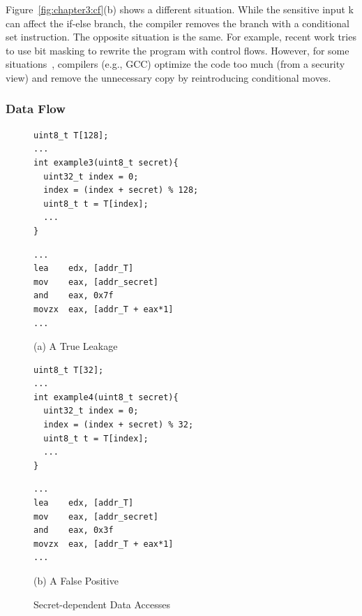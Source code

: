 Figure~\ref{fig:chapter3:cf}(b) shows a different situation. While the sensitive input \textsf{k} can affect the if-else branch, the compiler removes the branch with a conditional set instruction.  The opposite situation is the same. For example, recent work tries to use bit masking to rewrite the program with control flows. However, for some situations~\cite{Coppens:2009:PMT:1607723.1608124}, compilers (e.g., GCC) optimize the code too much (from a security view) and remove the unnecessary copy by reintroducing conditional moves.
\subsubsection{Data Flow}
\begin{figure}[h]
\begin{minipage}{0.4\linewidth}
\begin{lstlisting}[xleftmargin=.0\textwidth, xrightmargin=.0\textwidth, frame=none]
uint8_t T[128];
...
int example3(uint8_t secret){
  uint32_t index = 0;
  index = (index + secret) % 128;
  uint8_t t = T[index];
  ...
}
\end{lstlisting}
\end{minipage}
\hfill
\begin{minipage}{0.4\linewidth}
\begin{lstlisting}[xleftmargin=.0\textwidth, xrightmargin=.00\textwidth, frame=none, numbers=none, mathescape=true]
...
lea    edx, [addr_T]
mov    eax, [addr_secret]
and    eax, 0x7f
movzx  eax, [addr_T + eax*1]
...
\end{lstlisting}
\end{minipage}\caption*{(a) A True Leakage}

\begin{minipage}{0.4\linewidth}
\begin{lstlisting}[xleftmargin=.0\textwidth, xrightmargin=.0\textwidth, frame=none]
uint8_t T[32];
...
int example4(uint8_t secret){
  uint32_t index = 0;
  index = (index + secret) % 32;
  uint8_t t = T[index];
  ...
}
\end{lstlisting}
\end{minipage}
\hfill
\begin{minipage}{0.4\linewidth}
\begin{lstlisting}[xleftmargin=.0\textwidth, xrightmargin=.00\textwidth, frame=none, numbers=none, mathescape=true]
...
lea    edx, [addr_T]
mov    eax, [addr_secret]
and    eax, 0x3f
movzx  eax, [addr_T + eax*1]
...
\end{lstlisting}
\end{minipage}\caption*{(b) A False Positive}
\caption{Secret-dependent Data Accesses}\label{fig:chapter3:da}
\end{figure}

